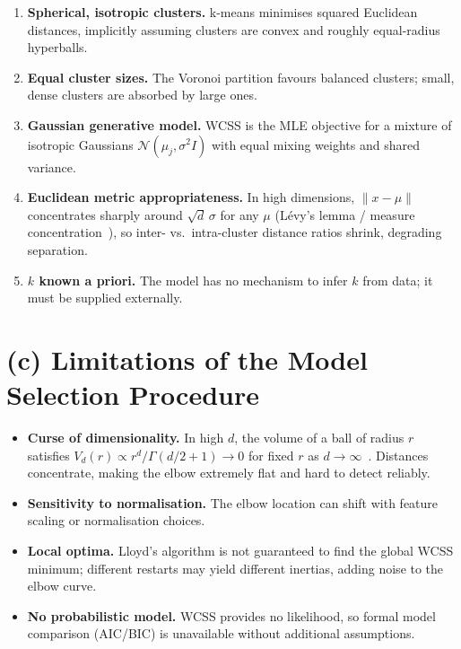 \documentclass[10pt,a4paper]{article}
\begin{document}
\begin{enumerate}\setlength\itemsep{1pt}\setlength\topsep{1pt}
  \item \textbf{Spherical, isotropic clusters.} k-means minimises squared
        Euclidean distances, implicitly assuming clusters are convex and
        roughly equal-radius hyperballs.
  \item \textbf{Equal cluster sizes.} The Voronoi partition favours balanced
        clusters; small, dense clusters are absorbed by large ones.
  \item \textbf{Gaussian generative model.} WCSS is the MLE objective for a
        mixture of isotropic Gaussians $\mathcal{N}(\mu_j, \sigma^2 I)$ with
        equal mixing weights and shared variance.
  \item \textbf{Euclidean metric appropriateness.} In high dimensions,
        $\|x-\mu\|$ concentrates sharply around $\sqrt{d}\,\sigma$ for any
        $\mu$ (Lévy's lemma / measure concentration~\cite{blum2020foundations}),
        so inter- vs.\ intra-cluster distance ratios shrink, degrading
        separation.
  \item \textbf{$k$ known a priori.} The model has no mechanism to infer $k$
        from data; it must be supplied externally.
\end{enumerate}

\section*{(c) Limitations of the Model Selection Procedure}

\begin{itemize}\setlength\itemsep{1pt}\setlength\topsep{1pt}
  \item \textbf{Curse of dimensionality.} In high $d$, the volume of a ball of
        radius $r$ satisfies $V_d(r)\propto r^d/\Gamma(d/2+1)\to 0$ for fixed
        $r$ as $d\to\infty$~\cite{blum2020foundations}.  Distances concentrate,
        making the elbow extremely flat and hard to detect reliably.
  \item \textbf{Sensitivity to normalisation.} The elbow location can shift
        with feature scaling or normalisation choices.
  \item \textbf{Local optima.} Lloyd's algorithm is not guaranteed to find the
        global WCSS minimum; different restarts may yield different inertias,
        adding noise to the elbow curve.
  \item \textbf{No probabilistic model.} WCSS provides no likelihood, so formal
        model comparison (AIC/BIC) is unavailable without additional assumptions.
\end{itemize}
\end{document}
